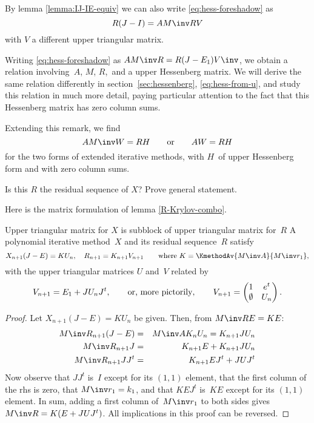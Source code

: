 By lemma \ref{lemma:IJ-IE-equiv}
we can also write \eqref{eq:hess-foreshadow} as
\begin{equation} R(J-I)=AM\inv RV
    \label{eq:r-hess-foreshadow1}
\end{equation}
with $V$ a different upper triangular matrix.

\begin{remark}\label{hess-from-R-update}
Writing \eqref{eq:hess-foreshadow} as $AM\inv R=R(J-E_1)V\inv$, we
obtain a relation involving~$A$, $M$, $R$,~and a upper Hessenberg
matrix. We will derive the same relation differently in
section~\ref{sec:hessenberg}, \eqref{eq:hess-from-u}, and study this
relation in much more detail, paying particular attention to the fact
that this Hessenberg matrix has zero column sums.
\end{remark}

\begin{extended}
Extending this remark, we find
\[ AM\inv W= RH \qquad\hbox{or}\qquad AW=RH\]
for the two forms of extended iterative methods,
with $H$~of upper Hessenberg form and with zero column sums.
\end{extended}

\begin{question}
Is this $R$ the residual sequence of $X$? Prove
general statement.
\end{question}

Here is the matrix formulation of lemma \ref{R-Krylov-combo}.

\begin{llemma}{Upper triangular matrix for $X$ is subblock of 
upper triangular matrix for~$R$}\label{lemma:xr-uptri}
A polynomial iterative method~$X$ and its residual
sequence~$R$ satisfy
\[
  X_{n+1}(J-E)=KU_n,\quad R_{n+1}=K_{n+1}V_{n+1}
  \qquad\hbox{where $K=\KmethodAv{M\inv A}{M\inv r_1}$},
\]
with the upper triangular matrices $U$ and~$V$
related by
\[
  V_{n+1}=E_1+JU_nJ^t,\qquad \hbox{or, more pictorily},
    \qquad V_{n+1}=\begin{pmatrix}1&e^t\cr \emptyset&U_n\cr\end{pmatrix}. 
\]
\end{llemma}
\begin{proof}
Let $X_{n+1}(J-E)=KU_n$ be given. Then, from $M\inv RE=KE$:
\begin{eqnarray*}
    M\inv R_{n+1}(J-E)&=&M\inv AK_nU_n=K_{n+1}JU_n\\
    M\inv R_{n+1}J&=&K_{n+1}E+K_{n+1}JU_n\\
    M\inv R_{n+1}JJ^t&=&K_{n+1}EJ^t+JUJ^t
\end{eqnarray*}
Now observe that $JJ^t$ is~$I$ except for its $(1,1)$ element, that
the first column of the rhs is zero, that $M\inv r_1=k_1$, and that $KEJ^t$
is~$KE$ except for its $(1,1)$ element. In sum, adding a first column
of~$M\inv r_1$ to both sides gives $M\inv R=K(E+JUJ^t)$.
All implications in this proof can be reversed.
\end{proof}

